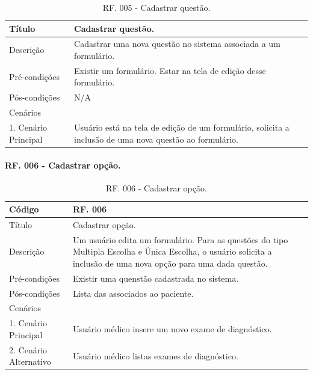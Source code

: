 \documentclass[11pt]{article}
\begin{document}
      \begin{table}[h]
        \begin{center}
          \begin{tabular}{ | p{5cm} | p{10cm} | }
            \hline
            Título\cellcolor{gray} & Cadastrar questão.\cellcolor{gray} \\
            \hline
            Descrição & Cadastrar uma nova questão no sistema associada a um formulário. \\
            \hline
            Pré-condições & Existir um formulário. Estar na tela de edição desse formulário. \\
            \hline
            Pós-condições & N/A \\
            \hline
            Cenários &   \\
            \hline
            1.  Cenário Principal & Usuário está na tela de edição de um formulário, solicita a inclusão de uma nova questão ao formulário. \\
            \hline
          \end{tabular}
          \caption{RF. 005 - Cadastrar questão.}
        \end{center}
      \end{table}
      
  \newpage

      \paragraph{RF. 006 - Cadastrar opção.} \hspace{10pt}

      \begin{table}[h]
        \begin{center}
          \begin{tabular}{ | p{5cm} | p{10cm} | }
            \hline
            Código\cellcolor{gray} & RF. 006\cellcolor{gray} \\
            \hline
            Título & Cadastrar opção. \\
            \hline
            Descrição & Um usuário edita um formulário. Para as questões do tipo Multipla Escolha e Única Escolha, o usuário solicita a inclusão de uma nova opção para uma dada questão. \\
            \hline
            Pré-condições & Existir uma quenstão cadastrada no sistema. \\
            \hline
            Pós-condições & Lista das associados ao paciente. \\
            \hline
            Cenários &   \\
            \hline
            1.  Cenário Principal & Usuário médico insere um novo exame de diagnóstico. \\
            \hline
            2.  Cenário Alternativo & Usuário médico listas exames de diagnóstico. \\
            \hline
          \end{tabular}
          \caption{RF. 006 - Cadastrar opção.}
        \end{center}
      \end{table}
\end{document}
